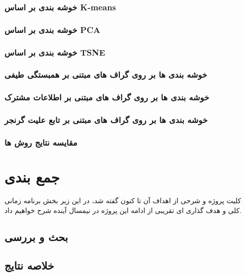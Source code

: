 \documentclass[11pt]{extarticle}
\begin{document}
\subsubsection{خوشه بندی بر اساس K-means}

\subsubsection{خوشه بندی بر اساس PCA}

\subsubsection{خوشه بندی بر اساس TSNE}

\subsubsection{خوشه بندی ها بر روی گراف های مبتنی بر همبستگی طیفی}

\subsubsection{خوشه بندی ها بر روی گراف های مبتنی بر اطلاعات مشترک}

\subsubsection{خوشه بندی ها بر روی گراف های مبتنی بر تابع علیت گرنجر}

\subsubsection{مقایسه نتایج روش ها}

\clearpage
\newpage

\section{جمع بندی}

کلیت پروژه و شرحی از اهداف آن تا کنون گفته شد، در این زیر بخش برنامه زمانی کلی و هدف گذاری ای تقریبی از ادامه این پروژه در نیمسال آینده شرح خواهیم داد. 
\subsection{بحث و بررسی}

\subsection{خلاصه نتایج}
\end{document}
